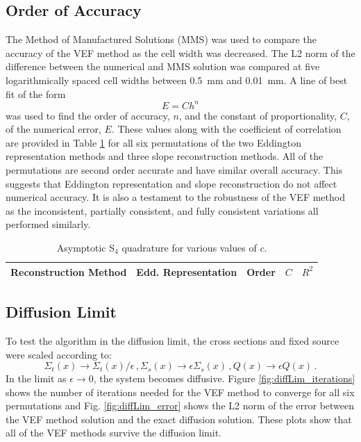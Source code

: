 \subsection{Order of Accuracy}
The Method of Manufactured Solutions (MMS) was used to compare the accuracy of the VEF method as the cell width was decreased. The L2 norm of the difference between the numerical and MMS solution was compared at five logarithmically spaced cell widths between \SI{0.5}{mm} and \SI{0.01}{mm}. A line of best fit of the form 
	\begin{equation} 
		E = C h^n 
	\end{equation}
was used to find the order of accuracy, $n$, and the constant of proportionality, $C$, of the numerical error, $E$. These values along with the coefficient of correlation are provided in Table \ref{tab:mms} for all six permutations of the two Eddington representation methods and three slope reconstruction methods. All of the permutations are second order accurate and have similar overall accuracy. This suggests that Eddington representation and slope reconstruction do not affect numerical accuracy. It is also a testament to the robustness of the VEF method as the inconsistent, partially consistent, and fully consistent variations all performed similarly. 
	\begin{table}[!h] \centering
	\begin{tabular}{|c|c|c|c|c|}
	\hline
	\hline
	Reconstruction Method & Edd. Representation & Order & $C$ & $R^2$ \\ 
	\hline
		
	\hline
	\hline
	\end{tabular}
	\caption{Asymptotic S$_4$ quadrature for various values of $c$.}
	\label{tab:mms}
	\end{table}
	\afterpage{\clearpage}

\subsection{Diffusion Limit}
To test the algorithm in the diffusion limit, the cross sections and fixed source were scaled according to: 
	\begin{subequations} \label{res:scaling}
	\begin{equation} 
		\Sigma_t(x) \rightarrow \Sigma_t(x)/\epsilon\,, 
	\end{equation}
	\begin{equation}
		\Sigma_s(x) \rightarrow \epsilon \Sigma_s(x) \,,
	\end{equation}
	\begin{equation}
		Q(x) \rightarrow \epsilon Q(x)\,. 
	\end{equation}
	\end{subequations}
In the limit as $\epsilon \rightarrow 0$, the system becomes diffusive. Figure \ref{fig:diffLim_iterations} shows the number of iterations needed for the VEF method to converge for all six permutations and Fig. \ref{fig:diffLim_error} shows the L2 norm of the error between the VEF method solution and the exact diffusion solution. These plots show that all of the VEF methods survive the diffusion limit. 

